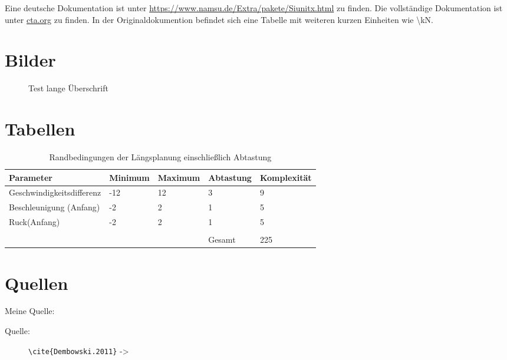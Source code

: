 Eine deutsche Dokumentation ist unter \href{https://www.namsu.de/Extra/pakete/Siunitx.html}{https://www.namsu.de/Extra/pakete/Siunitx.html} zu finden.
Die vollständige Dokumentation ist unter \href{https://ctan.org/pkg/siunitx?lang=de}{cta.org} zu finden. In der Originaldokumention befindet sich eine Tabelle mit weiteren kurzen Einheiten wie \textbackslash kN.


\section{Bilder}
\label{sec:bilder}

\begin{figure}[H]
	\centering
	
	\caption[Ü-kurz]{Test lange Überschrift}
	\label{abb:test}
\end{figure}


\section{Tabellen}
\label{sec:tabellen}

\begin{table}[H]%
	\centering
	\caption[Kurz für Verzeichnis]{Randbedingungen der Längsplanung einschließlich Abtastung}
	\label{tab:rand}
	\begin{tabular}{p{4.7cm}|p{2cm}|p{2cm}|p{2cm}|p{2.3cm}}
		\rowcolor{headrowcolor}
		Parameter & Minimum & Maximum & Abtastung & Komplexität \\ \hline
		Geschwindigkeitsdifferenz & -12 & 12 & 3 & 9 \\ 
		Beschleunigung (Anfang) & -2 & 2 & 1 & 5 \\ 
		Ruck(Anfang) & -2 & 2 & 1 & 5 \\ 
		& & & & \\
		&  &  & Gesamt & 225 \\ 
	\end{tabular} 
	
	\label{tab:param_raster_laengs}
\end{table}


\section{Quellen}
\label{sec:quellen}

Meine Quelle: 
\begin{description}
	\item[Quelle:] \verb=\cite{Dembowski.2011}= -> \cite{Dembowski.2011}
\end{description}